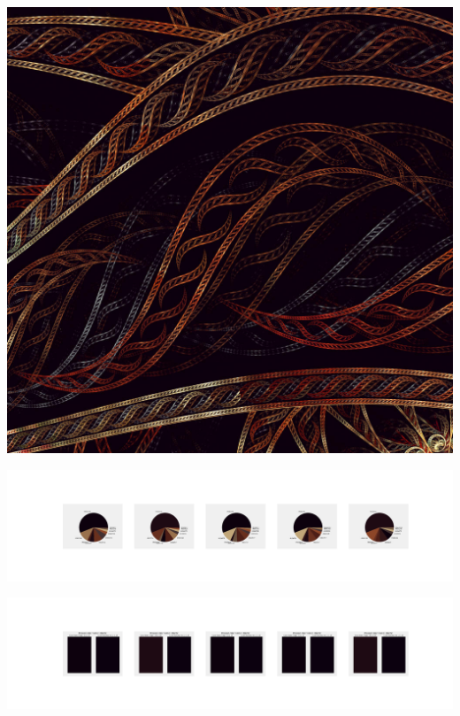 \documentclass[11pt]{article}
\begin{document}
\begin{landscape}
    \begin{center}
    \includegraphics[width=\textwidth]{./nbimg/file (352).jpg}
    \end{center}

    \begin{center}
    \includegraphics[width=250mm]{./nbimg/pie-281.jpg}
    \end{center}

    \begin{center}
    \includegraphics[width=250mm]{./nbimg/peak-281.jpg}
    \end{center}
    


\end{landscape}
\end{document}
